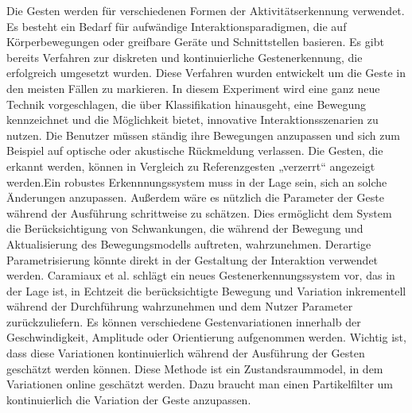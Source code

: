 \documentclass{llncs}
\begin{document}
Die Gesten werden für verschiedenen Formen der Aktivitätserkennung verwendet. Es besteht ein Bedarf für aufwändige Interaktionsparadigmen, die auf Körperbewegungen oder greifbare Geräte und Schnittstellen basieren. Es gibt bereits Verfahren zur diskreten und kontinuierliche Gestenerkennung, die erfolgreich umgesetzt wurden. Diese Verfahren wurden entwickelt um die Geste in den meisten Fällen zu markieren. In diesem Experiment wird eine ganz neue Technik vorgeschlagen, die über Klassifikation hinausgeht, eine Bewegung kennzeichnet und die Möglichkeit bietet, innovative Interaktionsszenarien zu nutzen.
Die Benutzer müssen  ständig ihre Bewegungen anzupassen und sich zum Beispiel auf optische oder akustische Rückmeldung verlassen. Die Gesten, die erkannt werden, können in Vergleich zu Referenzgesten „verzerrt“ angezeigt werden.Ein robustes Erkennnungssystem muss in der Lage sein, sich an solche Änderungen anzupassen. Außerdem wäre es nützlich die Parameter der Geste während der Ausführung schrittweise zu schätzen. Dies ermöglicht dem System die Berücksichtigung von Schwankungen, die während der Bewegung und Aktualisierung des Bewegungsmodells auftreten,  wahrzunehmen. Derartige Parametrisierung  könnte direkt in der Gestaltung der Interaktion verwendet werden.
Caramiaux et al. \cite{Caramiaux2014} schlägt ein neues Gestenerkennungssystem vor, das in der Lage ist, in Echtzeit die berücksichtigte Bewegung und Variation inkrementell während der Durchführung wahrzunehmen und dem Nutzer Parameter zurückzuliefern. Es können verschiedene Gestenvariationen innerhalb der Geschwindigkeit, Amplitude oder Orientierung aufgenommen werden. Wichtig ist, dass diese Variationen kontinuierlich während der Ausführung der Gesten geschätzt werden können. Diese Methode ist ein Zustandsraummodel, in dem Variationen online geschätzt werden. Dazu braucht man einen Partikelfilter um kontinuierlich die Variation der Geste anzupassen.
\end{document}
